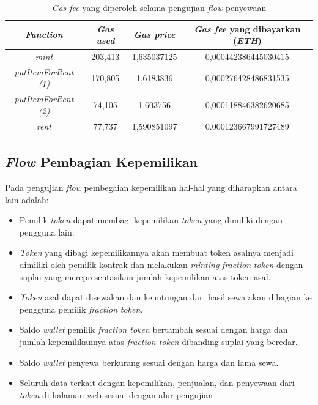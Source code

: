   \begin{longtable}{|c|c|c|c|}
      \caption{\emph{Gas fee} yang diperoleh selama pengujian \emph{flow} penyewaan}
      \label{tb:EnergiKecepatan}                                   \\
      \hline
      \rowcolor[HTML]{C0C0C0}
      \textbf{\emph{Function}} & \textbf{\emph{Gas used}} & \textbf{\emph{Gas price}} & \textbf{\emph{Gas fee} yang dibayarkan (\emph{ETH})} \\
      \hline
      \emph{mint}  & 203,413 & 1,635037125    & 0,000442386445030415    \\
      \emph{putItemForRent (1)}  & 170,805 & 1,6183836    & 0,000276428486831535    \\
      \emph{putItemForRent (2)} & 74,105 & 1,603756    & 0,000118846382620685      \\
      \emph{rent}               & 77,737 & 1,590851097    & 0.000123667991727489      \\
      \hline
    \end{longtable}

\subsection{\emph{Flow} Pembagian Kepemilikan}

Pada pengujian \emph{flow} pembegaian kepemilikan hal-hal yang diharapkan antara lain adalah:
\begin{itemize}
    \item Pemilik \emph{token} dapat membagi kepemilikan \emph{token} yang dimiliki dengan pengguna lain.
    \item \emph{Token} yang dibagi kepemilikannya akan membuat token asalnya menjadi dimiliki oleh pemilik kontrak dan melakukan \emph{minting} \emph{fraction} \emph{token}  dengan suplai yang merepresentasikan jumlah kepemilikan atas token asal. 
    \item \emph{Token} asal dapat disewakan dan keuntungan dari hasil sewa akan dibagian ke pengguna pemilik \emph{fraction} \emph{token}.
    \item Saldo \emph{wallet} pemilik \emph{fraction token} bertambah sesuai dengan harga dan jumlah kepemilikannya atas \emph{fraction token} dibanding suplai yang beredar.
    \item Saldo \emph{wallet} penyewa berkurang sesuai dengan harga dan lama sewa.
    \item Seluruh data terkait dengan kepemilikan, penjualan, dan penyewaan dari \emph{token} di halaman web sesuai dengan alur pengujian  
\end{itemize}

